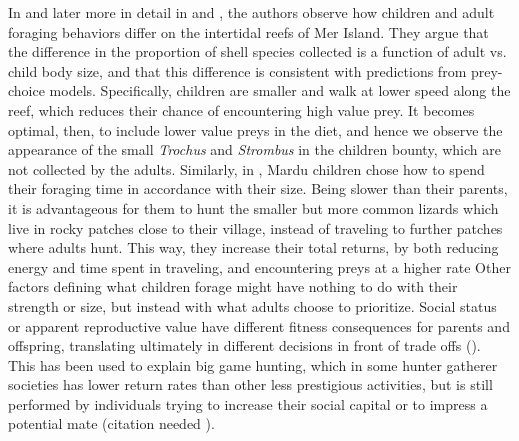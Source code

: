 In \cite{bliege_bird_children_1995} and later more in detail in \cite{bird_ethnoarchaeology_2000} and \cite{bird_children_2002}, the authors observe how children and adult foraging behaviors differ on the intertidal reefs of Mer Island. They argue that the difference in the proportion of shell species collected is a function of adult vs. child body size, and that this difference is consistent with predictions from prey-choice models. 
Specifically, children are smaller and walk at lower speed along the reef, which reduces their chance of encountering high value prey. It becomes optimal, then, to include lower value preys in the diet, and hence we observe the appearance of the small \textit{Trochus} and \textit{Strombus} in the children bounty, which are not collected by the adults.
Similarly, in \cite{bird_mardu_2005}, Mardu children chose how to spend their foraging time in accordance with their size. Being slower than their parents, it is advantageous for them to hunt the smaller but more common lizards which live in rocky patches close to their village, instead of traveling to further patches where adults hunt. This way, they increase their total returns, by both reducing energy and time spent in traveling, and encountering preys at a higher rate 
Other factors defining what children forage might have nothing to do with their strength or size, but instead with what adults choose to prioritize. Social status or apparent reproductive value have different fitness consequences for parents and offspring, translating ultimately in different decisions in front of trade offs (\cite{bird_constraints_2002}). This has been used to explain big game hunting, which in some hunter gatherer societies has lower return rates than other less prestigious activities, but is still performed by individuals trying to increase their social capital or to impress a potential mate (citation needed \cite{}).   


